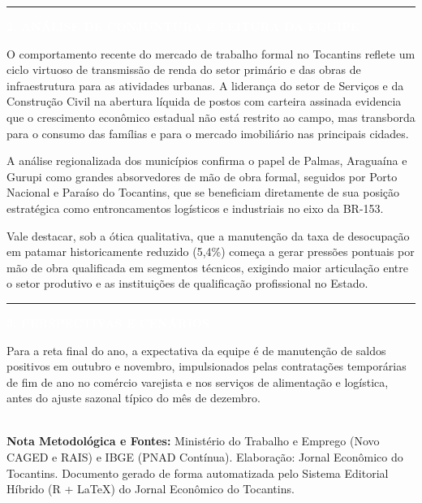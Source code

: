 \documentclass[10pt,a4paper]{article}
\newcommand{\secaojornal}[1]{%
  \vspace{6pt}%
  {\noindent\colorbox{azulto}{%
    \parbox{\dimexpr\textwidth-2\fboxsep\relax}{%
      \vspace{3pt}\hspace{4pt}\textcolor{douradoto}{\rule{7pt}{7pt}}\hspace{6pt}%
      \textcolor{white}{\textbf{\normalsize \MakeUppercase{#1}}}\vspace{3pt}%
    }%
  }}%
  \vspace{4pt}%
}
\begin{document}
\secaojornal{2. Análise de Conjuntura e Leitura da Equipe}

O comportamento recente do mercado de trabalho formal no Tocantins reflete um ciclo virtuoso de transmissão de renda do setor primário e das obras de infraestrutura para as atividades urbanas. A liderança do setor de Serviços e da Construção Civil na abertura líquida de postos com carteira assinada evidencia que o crescimento econômico estadual não está restrito ao campo, mas transborda para o consumo das famílias e para o mercado imobiliário nas principais cidades.

\vspace{4pt}

A análise regionalizada dos municípios confirma o papel de Palmas, Araguaína e Gurupi como grandes absorvedores de mão de obra formal, seguidos por Porto Nacional e Paraíso do Tocantins, que se beneficiam diretamente de sua posição estratégica como entroncamentos logísticos e industriais no eixo da BR-153.

\vspace{4pt}

Vale destacar, sob a ótica qualitativa, que a manutenção da taxa de desocupação em patamar historicamente reduzido (5,4\%) começa a gerar pressões pontuais por mão de obra qualificada em segmentos técnicos, exigindo maior articulação entre o setor produtivo e as instituições de qualificação profissional no Estado.

\secaojornal{3. Perspectivas e Cenários}

Para a reta final do ano, a expectativa da equipe é de manutenção de saldos positivos em outubro e novembro, impulsionados pelas contratações temporárias de fim de ano no comércio varejista e nos serviços de alimentação e logística, antes do ajuste sazonal típico do mês de dezembro.

\vfill
\noindent{\color{borda}\rule{\textwidth}{0.5pt}}\\[-2pt]
{\scriptsize\textcolor{cinzasuave}{\textbf{Nota Metodológica e Fontes:} Ministério do Trabalho e Emprego (Novo CAGED e RAIS) e IBGE (PNAD Contínua). Elaboração: Jornal Econômico do Tocantins. Documento gerado de forma automatizada pelo Sistema Editorial Híbrido (R + LaTeX) do Jornal Econômico do Tocantins.}}
\end{document}
